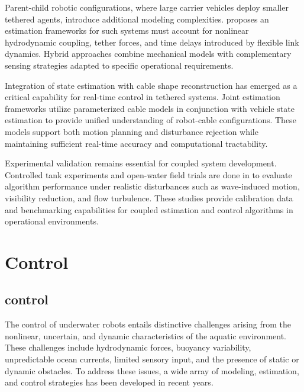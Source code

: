 Parent-child robotic configurations, where large carrier vehicles deploy smaller tethered agents,
introduce additional modeling complexities. \cite{kimParentchildUnderwaterRobotbased2023} proposes
an estimation frameworks for such systems must account for nonlinear hydrodynamic coupling, tether
forces, and time delays introduced by flexible link dynamics. Hybrid approaches combine mechanical
models with complementary sensing strategies adapted to specific operational requirements.

Integration of state estimation with cable shape reconstruction has emerged as a critical
capability for real-time control in tethered systems. Joint estimation frameworks utilize
parameterized cable models in conjunction with vehicle state estimation to provide unified
understanding of robot-cable configurations. These models support both motion planning and
disturbance rejection while maintaining sufficient real-time accuracy and computational
tractability.

Experimental validation remains essential for coupled system development. Controlled tank
experiments and open-water field trials are done in
\cite{laranjeiraCatenarybasedVisualServoing2020} to evaluate algorithm performance under realistic
disturbances such as wave-induced motion, visibility reduction, and flow turbulence. These studies
provide calibration data and benchmarking capabilities for coupled estimation and control
algorithms in operational environments.

\section{Control}
\label{sota_control}

\subsection{ control} \label{sota_c_uuv_control}

The control of underwater robots entails distinctive challenges arising from the nonlinear,
uncertain, and dynamic characteristics of the aquatic environment. These challenges include
hydrodynamic forces, buoyancy variability, unpredictable ocean currents, limited sensory input, and
the presence of static or dynamic obstacles. To address these issues, a wide array of modeling,
estimation, and control strategies has been developed in recent years.


